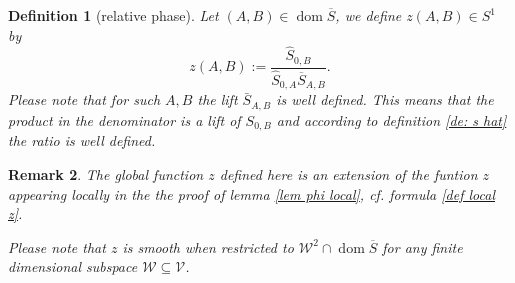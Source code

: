 \documentclass[b5paper,draft,openbib,12pt]{memoir}
\newtheorem{Def}{Definition}
\newtheorem{Remark}[Def]{Remark}
\DeclareMathOperator{\dom}{dom}
\begin{document}






\begin{Def}[relative phase]\label{def relative phase}
Let \((A,B) \in\dom\overline{S}\), we define \(z(A,B)\in S^1\) by
\begin{equation}\label{def z}
z(A,B):=\frac{\hat{S}_{0,B}}{\hat{S}_{0,A}\overline{S}_{A,B}}.
\end{equation}
Please note that for such \(A,B\) the lift \(\bar{S}_{A,B}\) 
is well defined. This means that the product in the 
denominator is a lift of \(S_{0,B}\)
and according to definition \ref{de: s hat} the 
ratio is well defined. 
\end{Def}

\begin{Remark}
The global function \(z\) defined here is an extension 
of the funtion \(z\) appearing locally 
in the 
the proof of lemma \ref{lem phi local},
cf. formula \eqref{def local z}.

Please note that \(z\) is smooth
when restricted to  \(\mathcal{W}^2\cap \dom\overline{S}\) 
for any finite dimensional subspace
 \(\mathcal{W}\subseteq \mathcal{V}\).
\end{Remark}
\end{document}
